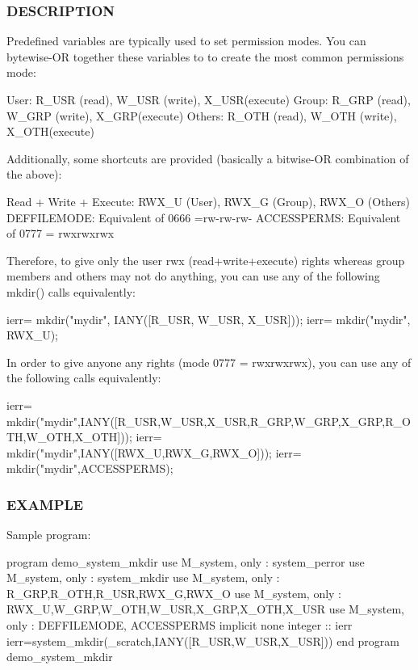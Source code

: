 \subsubsection*{D\+E\+S\+C\+R\+I\+P\+T\+I\+ON}

\begin{DoxyVerb}Predefined variables are typically used to set permission modes.
You can bytewise-OR together these variables to to create the most common
permissions mode:

 User:    R_USR  (read),  W_USR  (write),  X_USR(execute)
 Group:   R_GRP  (read),  W_GRP  (write),  X_GRP(execute)
 Others:  R_OTH  (read),  W_OTH  (write),  X_OTH(execute)

Additionally, some shortcuts are provided (basically a bitwise-OR combination of the above):

  Read + Write + Execute: RWX_U (User), RWX_G (Group), RWX_O (Others)
  DEFFILEMODE: Equivalent of 0666 =rw-rw-rw-
  ACCESSPERMS: Equivalent of 0777 = rwxrwxrwx

Therefore, to give only the user rwx (read+write+execute) rights whereas
group members and others may not do anything, you can use any of the
following mkdir() calls equivalently:

  ierr= mkdir("mydir", IANY([R_USR, W_USR, X_USR]));
  ierr= mkdir("mydir", RWX_U);

In order to give anyone any rights (mode 0777 = rwxrwxrwx), you can
use any of the following calls equivalently:

  ierr= mkdir("mydir",IANY([R_USR,W_USR,X_USR,R_GRP,W_GRP,X_GRP,R_OTH,W_OTH,X_OTH]));
  ierr= mkdir("mydir",IANY([RWX_U,RWX_G,RWX_O]));
  ierr= mkdir("mydir",ACCESSPERMS);
\end{DoxyVerb}


\subsubsection*{E\+X\+A\+M\+P\+LE}

Sample program\+:

program demo\+\_\+system\+\_\+mkdir use M\+\_\+system, only \+: system\+\_\+perror use M\+\_\+system, only \+: system\+\_\+mkdir use M\+\_\+system, only \+: R\+\_\+\+G\+RP,R\+\_\+\+O\+TH,R\+\_\+\+U\+SR,R\+W\+X\+\_\+G,R\+W\+X\+\_\+O use M\+\_\+system, only \+: R\+W\+X\+\_\+U,W\+\_\+\+G\+RP,W\+\_\+\+O\+TH,W\+\_\+\+U\+SR,X\+\_\+\+G\+RP,X\+\_\+\+O\+TH,X\+\_\+\+U\+SR use M\+\_\+system, only \+: D\+E\+F\+F\+I\+L\+E\+M\+O\+DE, A\+C\+C\+E\+S\+S\+P\+E\+R\+MS implicit none integer \+:\+: ierr ierr=system\+\_\+mkdir(\textquotesingle{}\+\_\+scratch\textquotesingle{},I\+A\+N\+Y(\mbox{[}\+R\+\_\+\+U\+S\+R,\+W\+\_\+\+U\+S\+R,\+X\+\_\+\+U\+S\+R\mbox{]})) end program demo\+\_\+system\+\_\+mkdir

